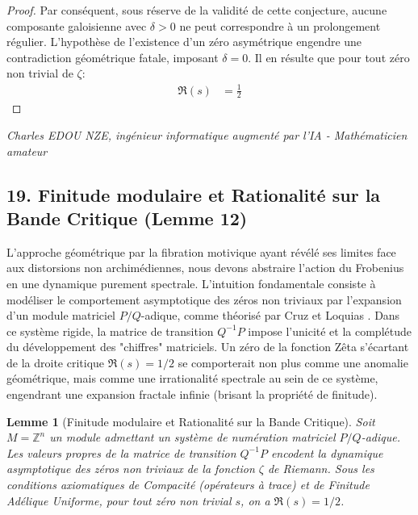 \documentclass[
]{article}
\newtheorem{lemma}{Lemme}
\begin{document}
\begin{proof}
Par conséquent, sous réserve de la validité de cette conjecture, aucune composante galoisienne avec $\delta > 0$ ne peut correspondre à un prolongement régulier. L'hypothèse de l'existence d'un zéro asymétrique engendre une contradiction géométrique fatale, imposant $\delta = 0$. Il en résulte que pour tout zéro non trivial de $\zeta$:
\begin{align*}
    \Re(s) &= \frac{1}{2}
\end{align*}
\end{proof}

\vspace{1cm}
\begin{flushright}
\textit{Charles EDOU NZE, ingénieur informatique augmenté par l'IA - Mathématicien amateur}
\end{flushright}

\subsection{19. Finitude modulaire et Rationalité sur la Bande Critique (Lemme 12)}

L'approche géométrique par la fibration motivique ayant révélé ses limites face aux distorsions non archimédiennes, nous devons abstraire l'action du Frobenius en une dynamique purement spectrale. L'intuition fondamentale consiste à modéliser le comportement asymptotique des zéros non triviaux par l'expansion d'un module matriciel $P/Q$-adique, comme théorisé par Cruz et Loquias \cite{cruz2026}. Dans ce système rigide, la matrice de transition $Q^{-1}P$ impose l'unicité et la complétude du développement des "chiffres" matriciels. Un zéro de la fonction Zêta s'écartant de la droite critique $\Re(s) = 1/2$ se comporterait non plus comme une anomalie géométrique, mais comme une irrationalité spectrale au sein de ce système, engendrant une expansion fractale infinie (brisant la propriété de finitude).

\begin{lemma}[Finitude modulaire et Rationalité sur la Bande Critique]
    Soit $M = \mathbb{Z}^n$ un module admettant un système de numération matriciel $P/Q$-adique. Les valeurs propres de la matrice de transition $Q^{-1}P$ encodent la dynamique asymptotique des zéros non triviaux de la fonction $\zeta$ de Riemann. Sous les conditions axiomatiques de Compacité (opérateurs à trace) et de Finitude Adélique Uniforme, pour tout zéro non trivial $s$, on a $\Re(s) = 1/2$.
\end{lemma}
\end{document}
